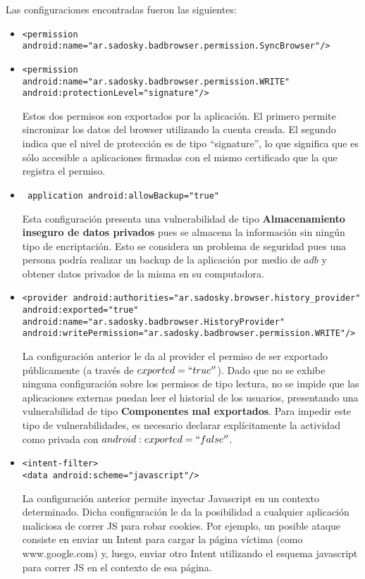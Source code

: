 \documentclass[10pt, a4paper]{article}
\begin{document}
Las configuraciones encontradas fueron las siguientes:
\begin{itemize}
\item \begin{verbatim}<permission android:name="ar.sadosky.badbrowser.permission.SyncBrowser"/> \end{verbatim} 
\item \begin{verbatim}<permission
android:name="ar.sadosky.badbrowser.permission.WRITE"
android:protectionLevel="signature"/> \end{verbatim}

Estos dos permisos son exportados por la aplicación. El primero permite sincronizar los datos del browser utilizando la cuenta creada. El segundo indica que el nivel de protección es de tipo ``signature'', lo que significa que es sólo accesible a aplicaciones firmadas con el mismo certificado que la que registra el permiso.

\item \begin{verbatim} application android:allowBackup="true" \end{verbatim}

Esta configuración presenta una vulnerabilidad de tipo \textbf{Almacenamiento inseguro de datos privados} pues se almacena la información sin ningún tipo de encriptación. Esto se considera un problema de seguridad pues una persona podría realizar un backup de la aplicación por medio de $adb$ y obtener datos privados de la misma en su computadora.


\item \begin{verbatim}
<provider android:authorities="ar.sadosky.browser.history_provider"
android:exported="true"
android:name="ar.sadosky.badbrowser.HistoryProvider"
android:writePermission="ar.sadosky.badbrowser.permission.WRITE"/>
\end{verbatim}

La configuración anterior le da al provider el permiso de ser exportado públicamente (a través de $exported=``true''$).
Dado que no se exhibe ninguna configuración sobre los permisos de tipo lectura, no se impide que las aplicaciones externas puedan leer el historial de los usuarios, presentando una vulnerabilidad de tipo \textbf{Componentes mal exportados}. Para impedir este tipo de vulnerabilidades, es necesario declarar explícitamente la actividad como privada con $android:exported=``false''$.

\item \begin{verbatim}
<intent-filter>
<data android:scheme="javascript"/>
\end{verbatim}
La configuración anterior permite inyectar Javascript en un contexto determinado. Dicha configuración le da la posibilidad a cualquier aplicación maliciosa de correr JS para robar cookies. Por ejemplo, un posible ataque consiste en enviar un Intent para cargar la página víctima (como www.google.com) y, luego, enviar otro Intent utilizando el esquema javascript para correr JS en el contexto de esa página.
\end{itemize}
\end{document}
